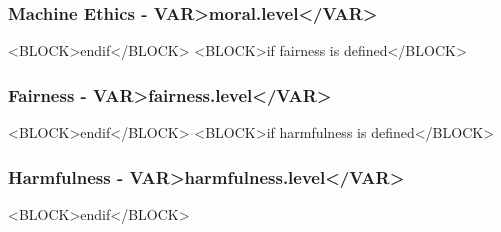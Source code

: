 \subsubsection{Machine Ethics - \<VAR>moral.level</VAR>}




\clearpage
<BLOCK>endif</BLOCK>
<BLOCK>if fairness is defined</BLOCK>
\subsubsection{Fairness - \<VAR>fairness.level</VAR>}




\clearpage
<BLOCK>endif</BLOCK>
<BLOCK>if harmfulness is defined</BLOCK>
\subsubsection{Harmfulness - \<VAR>harmfulness.level</VAR>}



<BLOCK>endif</BLOCK>